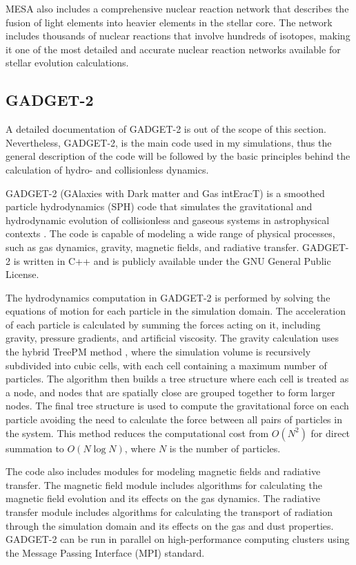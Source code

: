 MESA also includes a comprehensive nuclear reaction network that describes the fusion of light elements into heavier elements in the stellar core. The network includes thousands of nuclear reactions that involve hundreds of isotopes, making it one of the most detailed and accurate nuclear reaction networks available for stellar evolution calculations.


\subsection{GADGET-2}

A detailed documentation of GADGET-2 is out of the scope of this section. Nevertheless, GADGET-2, is the main code used in my simulations, thus the general description of the code will be followed by the basic principles behind the calculation of hydro- and collisionless dynamics.

GADGET-2 (GAlaxies with Dark matter and Gas intEracT) is a smoothed particle hydrodynamics (SPH) code that simulates the gravitational and hydrodynamic evolution of collisionless and gaseous systems in astrophysical contexts \citep{springel2005cosmological}. The code is capable of modeling a wide range of physical processes, such as gas dynamics, gravity, magnetic fields, and radiative transfer. GADGET-2 is written in C++ and is publicly available under the GNU General Public License.

The hydrodynamics computation in GADGET-2 is performed by solving the equations of motion for each particle in the simulation domain. The acceleration of each particle is calculated by summing the forces acting on it, including gravity, pressure gradients, and artificial viscosity. The gravity calculation uses the hybrid TreePM method \citep{bode2000tree,bagla2002treepm}, where the simulation volume is recursively subdivided into cubic cells, with each cell containing a maximum number of particles. The algorithm then builds a tree structure where each cell is treated as a node, and nodes that are spatially close are grouped together to form larger nodes. The final tree structure is used to compute the gravitational force on each particle avoiding the need to calculate the force between all pairs of particles in the system. This method reduces the computational cost from $O(N^2)$ for direct summation to $O(N\log N)$, where $N$ is the number of particles.

The code also includes modules for modeling magnetic fields and radiative transfer. The magnetic field module includes algorithms for calculating the magnetic field evolution and its effects on the gas dynamics. The radiative transfer module includes algorithms for calculating the transport of radiation through the simulation domain and its effects on the gas and dust properties. GADGET-2 can be run in parallel on high-performance computing clusters using the Message Passing Interface (MPI) standard.

